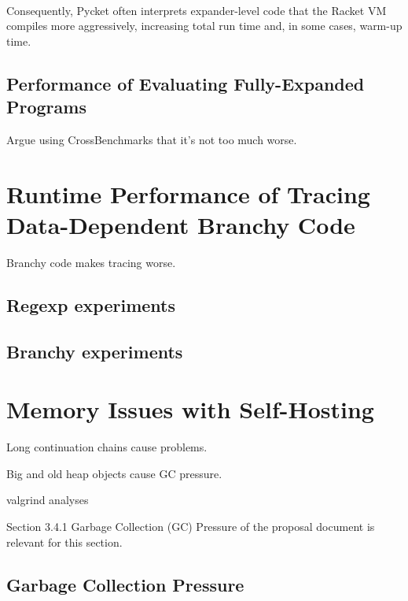 			\paragraph{}%
			Consequently, Pycket often interprets expander-level code that the Racket VM compiles more aggressively, increasing total run time and, in some cases, warm-up time.

		\subsection{Performance of Evaluating Fully-Expanded Programs}

			\begin{mainpoint}
				Argue using CrossBenchmarks that it's not too much worse.
			\end{mainpoint}

	\section{Runtime Performance of Tracing Data-Dependent Branchy Code}
		\begin{mainpoint}
			Branchy code makes tracing worse.
		\end{mainpoint}


		\subsection{Regexp experiments}
		\subsection{Branchy experiments}
			\label{section:branchy}

	\section{Memory Issues with Self-Hosting}
		\label{section:memory}

		\begin{mainpoint}
			Long continuation chains cause problems.

			Big and old heap objects cause GC pressure.
		\end{mainpoint}

		valgrind analyses

		\begin{todo}[Import]
			Section 3.4.1 Garbage Collection (GC) Pressure of the proposal document is relevant for this section.
		\end{todo}

		\subsection{Garbage Collection Pressure}

